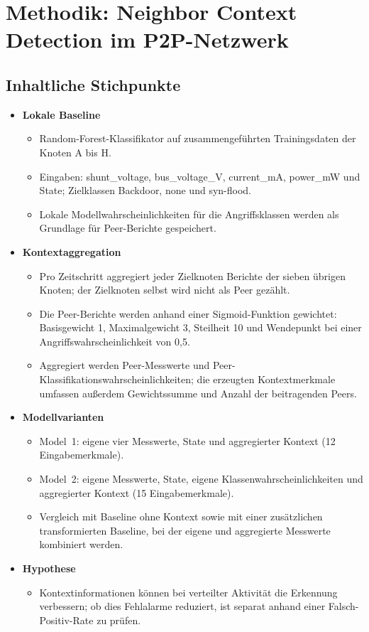 \section{Methodik: Neighbor Context Detection im P2P-Netzwerk}
\label{sec:methodology}

\subsection{Inhaltliche Stichpunkte}
\begin{itemize}
  \item \textbf{Lokale Baseline}
  \begin{itemize}
    \item Random-Forest-Klassifikator auf zusammengeführten Trainingsdaten
          der Knoten A bis H.
    \item Eingaben: shunt\_voltage, bus\_voltage\_V, current\_mA,
          power\_mW und State; Zielklassen Backdoor, none und syn-flood.
    \item Lokale Modellwahrscheinlichkeiten für die Angriffsklassen werden
          als Grundlage für Peer-Berichte gespeichert.
  \end{itemize}
  \item \textbf{Kontextaggregation}
  \begin{itemize}
    \item Pro Zeitschritt aggregiert jeder Zielknoten Berichte der sieben
          übrigen Knoten; der Zielknoten selbst wird nicht als Peer gezählt.
    \item Die Peer-Berichte werden anhand einer Sigmoid-Funktion gewichtet:
          Basisgewicht 1, Maximalgewicht 3, Steilheit 10 und Wendepunkt bei
          einer Angriffswahrscheinlichkeit von 0{,}5.
    \item Aggregiert werden Peer-Messwerte und Peer-Klassifikationswahrscheinlichkeiten;
          die erzeugten Kontextmerkmale umfassen außerdem Gewichtssumme und
          Anzahl der beitragenden Peers.
  \end{itemize}
  \item \textbf{Modellvarianten}
  \begin{itemize}
    \item Model~1: eigene vier Messwerte, State und aggregierter Kontext
          (12 Eingabemerkmale).
    \item Model~2: eigene Messwerte, State, eigene Klassenwahrscheinlichkeiten
          und aggregierter Kontext (15 Eingabemerkmale).
    \item Vergleich mit Baseline ohne Kontext sowie mit einer zusätzlichen
          transformierten Baseline, bei der eigene und aggregierte Messwerte
          kombiniert werden.
  \end{itemize}
  \item \textbf{Hypothese}
  \begin{itemize}
    \item Kontextinformationen können bei verteilter Aktivität die
          Erkennung verbessern; ob dies Fehlalarme reduziert, ist separat
          anhand einer Falsch-Positiv-Rate zu prüfen.
  \end{itemize}
\end{itemize}

